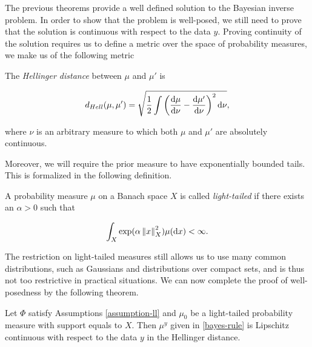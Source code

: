 The previous theorems provide a well defined solution to the Bayesian inverse problem. In order to show that the problem is well-posed, we still need to prove that the solution is continuous with respect to the data $y$. Proving continuity of the solution requires us to define a metric over the space of probability measures, we make us of the following metric

\begin{definition} The \textit{Hellinger distance} between $\mu$ and $\mu'$ is

  \begin{equation*}
    d_{Hell}(\mu, \mu') = \sqrt{\frac12\int\left(\frac{\text{d} \mu}{\text{d} \nu} - \frac{\text{d} \mu'}{\text{d} \nu}\right)^2\text{d} \nu},
  \end{equation*}

  where $\nu$ is an arbitrary measure to which both $\mu$ and $\mu'$ are absolutely continuous.
\end{definition}

Moreover, we will require the prior measure to have exponentially bounded tails. This is formalized in the following definition.

\begin{definition}
  A probability measure $\mu$ on a Banach space $X$ is called \textit{light-tailed} if there exists an $\alpha > 0$ such that

  \begin{equation*}
    \int_X\exp(\alpha\left\lVert x\right\rVert^2_X)\mu(\text{d} x) < \infty.
  \end{equation*}
\end{definition}

The restriction on light-tailed measures still allows us to use many common distributions, such as Gaussians and distributions over compact sets, and is thus not too restrictive in practical situations. We can now complete the proof of well-posedness by the following theorem.

\begin{theorem}
  Let $\Phi$ satisfy Assumptions \ref{assumption-ll} and $\mu_0$ be a light-tailed probability measure with support equals to $X$. Then $\mu^y$ given in \ref{bayes-rule} is Lipschitz continuous with respect to the data $y$ in the Hellinger distance.
\end{theorem}

